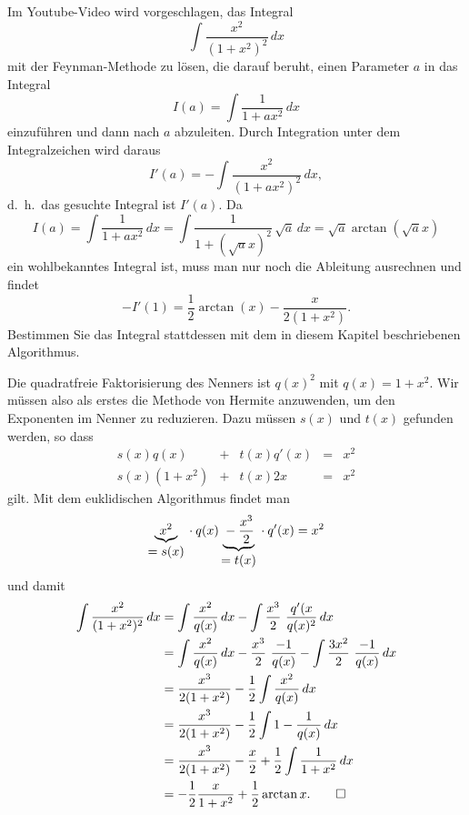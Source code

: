 Im Youtube-Video \cite{buch:feynman} wird vorgeschlagen, das Integral
\[
\int \frac{x^2}{(1+x^2)^2}\,dx
\]
mit der Feynman-Methode zu lösen, die darauf beruht, einen Parameter
$a$ in das Integral
\[
I(a)
=
\int \frac{1}{1+ax^2}\,dx
\]
einzuführen und dann nach $a$ abzuleiten.
Durch Integration unter dem Integralzeichen wird daraus
\[
I'(a)
=
-
\int \frac{x^2}{(1+ax^2)^2}\,dx,
\]
d.~h.~das gesuchte Integral ist $I'(a)$.
Da
\[
I(a)
=
\int \frac{1}{1+ax^2}\,dx
=
\int \frac{1}{1+(\!\sqrt{a}x)^2}\,\!\sqrt{a}\,dx
=
\!\sqrt{a}
\arctan(\!\sqrt{a}x)
\]
ein wohlbekanntes Integral ist, muss man nur noch die Ableitung ausrechnen
und findet
\[
-
I'(1) = \frac12 \arctan(x) - \frac{x}{2(1+x^2)}.
\]
Bestimmen Sie das Integral stattdessen mit dem in diesem Kapitel
beschriebenen Algorithmus.

\begin{loesung}
Die quadratfreie Faktorisierung des Nenners ist $q(x)^2$ mit $q(x)=1+x^2$.
Wir müssen also als erstes die Methode von Hermite anzuwenden, um den
Exponenten im Nenner zu reduzieren.
Dazu müssen $s(x)$ und $t(x)$ gefunden werden, so dass
\[
\begin{array}{rcrcl}
s(x)q(x)    &+& t(x)q'(x) &=& x^2 \\
s(x)(1+x^2) &+& t(x) 2x &=& x^2
\end{array}
\]
gilt.
Mit dem euklidischen Algorithmus findet man
\[
\underbrace{x^2}_{\displaystyle=s(x)}\mathstrut\cdot q(x)
\underbrace{\mathstrut-\frac{x^3}{2}}_{\displaystyle=t(x)}\mathstrut\cdot q'(x) = x^2
\]
und damit
\begin{align*}
\int
\frac{x^2}{(1+x^2)^2}\,dx
&=
\int \frac{x^2}{q(x)}\,dx
-
\int \frac{x^3}{2} \frac{q'(x}{q(x)^2}\,dx
\\
&=
\int \frac{x^2}{q(x)}\,dx
-
\frac{x^3}{2} \frac{-1}{q(x)}
-
\int
\frac{3x^2}{2} \frac{-1}{q(x)}
\,dx
\\
&=
\frac{x^3}{2(1+x^2)}
-
\frac{1}{2}
\int
\frac{x^2}{q(x)}\,dx
\\
&=
\frac{x^3}{2(1+x^2)}
-
\frac{1}{2}
\int
1-
\frac{1}{q(x)}
\,dx
\\
&=
\frac{x^3}{2(1+x^2)}
-
\frac{x}{2}
+
\frac12
\int\frac{1}{1+x^2}\,dx
\\
&=
-
\frac12
\frac{x}{1+x^2}
+
\frac12\arctan x.
\qedhere
\end{align*}
\end{loesung}
